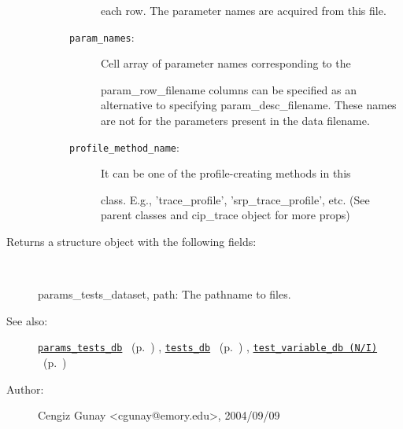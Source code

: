 \begin{description}
\begin{description}
\begin{description}
each row. The parameter names are acquired from this file.\item[\texttt{param\_names}:]
 Cell array of parameter names corresponding to the 

param\_row\_filename columns can be specified as an alternative to
specifying param\_desc\_filename. These names are not for the 
parameters present in the data filename.\item[\texttt{profile\_method\_name}:]
 It can be one of the profile-creating methods in this

class. E.g., 'trace\_profile', 'srp\_trace\_profile', etc.
(See parent classes and cip\_trace object for more props)\end{description}%
\end{description}%
%
\item[Returns a structure object with the following fields:]~

	params\_tests\_dataset,
	path: The pathname to files.
%
%
\item[See also:]%
\hyperlink{ref_params_tests_db}{\texttt{params\_tests\_db}}%
\ (p.~\pageref{ref_params_tests_db})%
%
, \hyperlink{ref_tests_db}{\texttt{tests\_db}}%
\ (p.~\pageref{ref_tests_db})%
%
, \hyperlink{ref_test_variable_db (N__I)}{\texttt{test\_variable\_db (N/I)}}%
\ (p.~\pageref{ref_test_variable_db (N__I)})%
%
%
\item[Author:]%
Cengiz Gunay <cgunay@emory.edu>, 2004/09/09%
\end{description}
\methodline%
